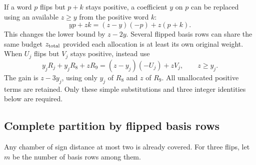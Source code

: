 \documentclass[
  11pt,
]{article}
\begin{document}
If a word \(p\) flips but \(p+k\) stays positive, a coefficient \(y\) on
\(p\) can be replaced using an available \(z\ge y\) from the positive
word \(k\): \[
 yp+zk=(z-y)(-p)+z(p+k).
\] This changes the lower bound by \(z-2y\). Several flipped basis rows
can share the same budget \(z_{\rm total}\) provided each allocation is
at least its own original weight. When \(U_j\) flips but \(V_j\) stays
positive, instead use \[
 y_jR_j+y_jR_8+zR_9=(z-y_j)(-U_j)+zV_j,\qquad z\ge y_j.
\] The gain is \(z-3y_j\), using only \(y_j\) of \(R_8\) and \(z\) of
\(R_9\). All unallocated positive terms are retained. Only these simple
substitutions and three integer identities below are required.

\subsection{Complete partition by flipped basis
rows}\label{complete-partition-by-flipped-basis-rows}

Any chamber of sign distance at most two is already covered. For three
flips, let \(m\) be the number of basis rows among them.
\end{document}
